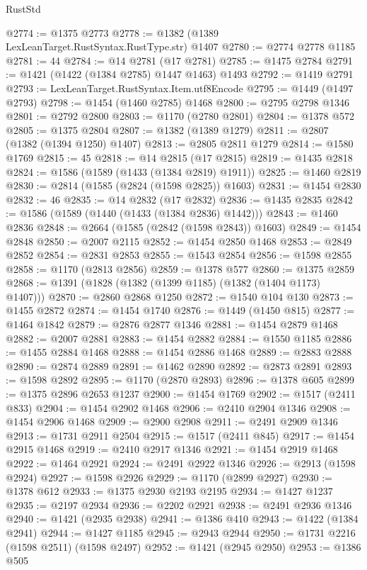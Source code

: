 \begin{lexlean}{RustStd}
\begin{coremodule}
@2774 := @1375 @2773
@2778 := @1382 (@1389 LexLeanTarget.RustSyntax.RustType.str) @1407
@2780 := @2774 @2778 @1185
@2781 := 44
@2784 := @14 @2781 (@17 @2781)
@2785 := @1475 @2784
@2791 := @1421 (@1422 (@1384 @2785) @1447 @1463) @1493
@2792 := @1419 @2791
@2793 := LexLeanTarget.RustSyntax.Item.utf8Encode
@2795 := @1449 (@1497 @2793)
@2798 := @1454 (@1460 @2785) @1468
@2800 := @2795 @2798 @1346
@2801 := @2792 @2800
@2803 := @1170 (@2780 @2801)
@2804 := @1378 @572
@2805 := @1375 @2804
@2807 := @1382 (@1389 @1279)
@2811 := @2807 (@1382 (@1394 @1250) @1407)
@2813 := @2805 @2811 @1279
@2814 := @1580 @1769
@2815 := 45
@2818 := @14 @2815 (@17 @2815)
@2819 := @1435 @2818
@2824 := @1586 (@1589 (@1433 (@1384 @2819) @1911))
@2825 := @1460 @2819
@2830 := @2814 (@1585 (@2824 (@1598 @2825)) @1603)
@2831 := @1454 @2830
@2832 := 46
@2835 := @14 @2832 (@17 @2832)
@2836 := @1435 @2835
@2842 := @1586 (@1589 (@1440 (@1433 (@1384 @2836) @1442)))
@2843 := @1460 @2836
@2848 := @2664 (@1585 (@2842 (@1598 @2843)) @1603)
@2849 := @1454 @2848
@2850 := @2007 @2115
@2852 := @1454 @2850 @1468
@2853 := @2849 @2852
@2854 := @2831 @2853
@2855 := @1543 @2854
@2856 := @1598 @2855
@2858 := @1170 (@2813 @2856)
@2859 := @1378 @577
@2860 := @1375 @2859
@2868 := @1391 (@1828 (@1382 (@1399 @1185) (@1382 (@1404 @1173) @1407)))
@2870 := @2860 @2868 @1250
@2872 := @1540 @104 @130
@2873 := @1455 @2872
@2874 := @1454 @1740
@2876 := @1449 (@1450 @815)
@2877 := @1464 @1842
@2879 := @2876 @2877 @1346
@2881 := @1454 @2879 @1468
@2882 := @2007 @2881
@2883 := @1454 @2882
@2884 := @1550 @1185
@2886 := @1455 @2884 @1468
@2888 := @1454 @2886 @1468
@2889 := @2883 @2888
@2890 := @2874 @2889
@2891 := @1462 @2890
@2892 := @2873 @2891
@2893 := @1598 @2892
@2895 := @1170 (@2870 @2893)
@2896 := @1378 @605
@2899 := @1375 @2896 @2653 @1237
@2900 := @1454 @1769
@2902 := @1517 (@2411 @833)
@2904 := @1454 @2902 @1468
@2906 := @2410 @2904 @1346
@2908 := @1454 @2906 @1468
@2909 := @2900 @2908
@2911 := @2491 @2909 @1346
@2913 := @1731 @2911 @2504
@2915 := @1517 (@2411 @845)
@2917 := @1454 @2915 @1468
@2919 := @2410 @2917 @1346
@2921 := @1454 @2919 @1468
@2922 := @1464 @2921
@2924 := @2491 @2922 @1346
@2926 := @2913 (@1598 @2924)
@2927 := @1598 @2926
@2929 := @1170 (@2899 @2927)
@2930 := @1378 @612
@2933 := @1375 @2930 @2193 @2195
@2934 := @1427 @1237
@2935 := @2197 @2934
@2936 := @2202 @2921
@2938 := @2491 @2936 @1346
@2940 := @1421 (@2935 @2938)
@2941 := @1386 @410
@2943 := @1422 (@1384 @2941)
@2944 := @1427 @1185
@2945 := @2943 @2944
@2950 := @1731 @2216 (@1598 @2511) (@1598 @2497)
@2952 := @1421 (@2945 @2950)
@2953 := @1386 @505

\end{coremodule}
\end{lexlean}
